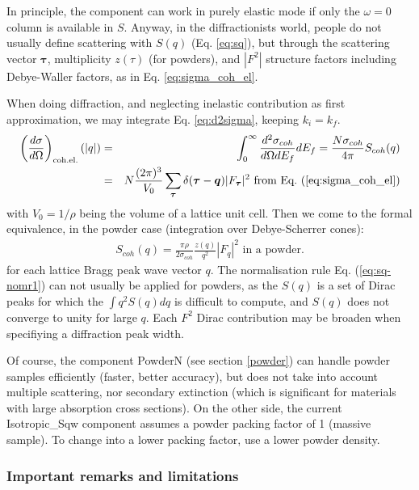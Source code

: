 In principle, the component can work in purely elastic mode if only the $\omega = 0$ column is available in $S$.
Anyway, in the diffractionists world, people do not usually define scattering with $S(q)$ (Eq. \ref{eq:sq}), but through the scattering vector $\boldsymbol{\tau}$, multiplicity $z(\tau)$ (for powders), and $|F^2|$ structure factors including Debye-Waller factors, as in Eq. \ref{eq:sigma_coh_el}.

When doing diffraction, and neglecting inelastic contribution as first approximation, we may integrate Eq. \ref{eq:d2sigma}, keeping $k_i = k_f$.
\begin{eqnarray}
\left(\frac{d\sigma}{d\Omega}\right)_\textrm{coh.el.}(|q|) &=& \int_0^\infty \frac{d^2\sigma_{coh}}{d\Omega dE_f} dE_f = \frac{N \sigma_{coh}}{4\pi} S_{coh}(q) \\
& = & N\frac{(2\pi)^3}{V_0}\sum_{\boldsymbol{\tau}} \delta(\boldsymbol{\tau} - \boldsymbol{q})|F_{\boldsymbol{\tau}}|^2 \textrm{\ from\ Eq.\ (\ref{eq:sigma_coh_el})}
\end{eqnarray}
with $V_0 = 1/\rho$ being the volume of a lattice unit cell. Then we come to the formal equivalence, in the powder case \cite{squires} (integration over Debye-Scherrer cones):
\begin{equation}
  \label{eq:sq-F2}
  \begin{aligned}
S_{coh}(q) = \frac{\pi \rho}{2\sigma_{coh}} \frac{z(q)}{q^2} |F_q|^2 \textrm{\ in\ a\ powder.}
  \end{aligned}
\end{equation}
for each lattice Bragg peak wave vector $q$.
The normalisation rule Eq. (\ref{eq:sq-nomr1}) can not usually be applied for powders, as the $S(q)$ is a set of Dirac peaks for which the $\int q^2 S(q) dq$ is difficult to compute, and $S(q)$ does not converge to unity for large $q$. Each $F^2$ Dirac contribution may be broaden when specifiying a diffraction peak width.

Of course, the component PowderN (see section \ref{powder}) can handle powder samples efficiently (faster, better accuracy), but does not take into account multiple scattering, nor secondary extinction (which is significant for materials with large absorption cross sections). On the other side, the current Isotropic\_Sqw component assumes a powder packing factor of 1 (massive sample). To change into a lower packing factor, use a lower powder density.

\subsubsection{Important remarks and limitations}

